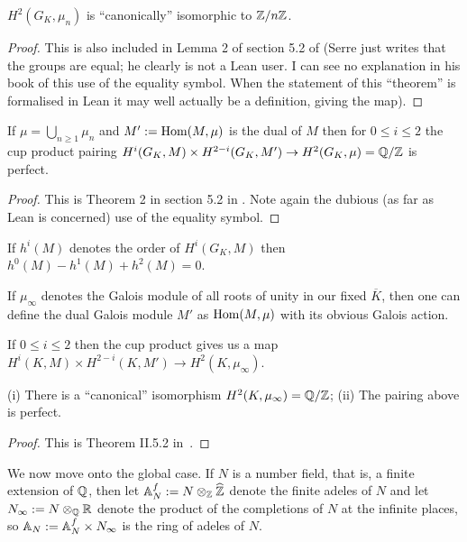 \begin{theorem} \label{local_galois_coh_top_degree}\notready $H^2(G_K,\mu_n)$ is ``canonically'' isomorphic to $\mathbb{Z}/n\mathbb{Z}$.
\end{theorem}
\begin{proof} This is also included in Lemma 2 of section 5.2 of \cite{serre-galcoh} (Serre just writes that the groups are equal; he clearly is not a Lean user. I can see no explanation in his book of this use of the equality symbol. When the statement of this ``theorem'' is formalised in Lean it may well actually be a definition, giving the map).
\end{proof}

\begin{theorem} \label{local_galois_coh_poincare}\notready If $\mu=\bigcup_{n\geq1}\mu_n$ and $M':=\operatorname{Hom}(M,\mu)$ is the dual of $M$ then for $0\leq i\leq 2$ the cup product pairing $H^i(G_K,M)\times H^{2-i}(G_K,M')\to H^2(G_K,\mu)=\mathbb{Q}/\mathbb{Z}$ is perfect.
\end{theorem}
\begin{proof}\notready This is Theorem 2 in section 5.2 in \cite{serre-galcoh}. Note again the dubious (as far as Lean is concerned) use of the equality symbol.
\end{proof}

\begin{theorem} \label{local_galois_coh_euler_poincare}\notready If $h^i(M)$ denotes the order of $H^i(G_K,M)$ then $h^0(M)-h^1(M)+h^2(M)=0$.
\end{theorem}

    If $\mu_\infty$ denotes the Galois module of all roots of unity in our fixed $\overline{K}$, then one can define the dual Galois module $M'$ as $\operatorname{Hom}(M,\mu)$ with its obvious Galois action.

If $0\leq i\leq 2$ then the cup product gives us a map $H^i(K,M)\times H^{2-i}(K,M')\to H^2(K,\mu_\infty)$.

\begin{theorem}\label{local_galois_coh_tate_duality}\notready
    (i) There is a ``canonical'' isomorphism $H^2(K,\mu_\infty)=\mathbb{Q}/\mathbb{Z}$;
    (ii) The pairing above is perfect.
\end{theorem}
\begin{proof}\notready
This is Theorem II.5.2 in~\cite{serre-galcoh}.
\end{proof}

We now move onto the global case. If $N$ is a number field, that is, a finite extension of $\mathbb{Q}$,
then let $\mathbb{A}_N^f:= N\otimes_{\mathbb{Z}}\widehat{\mathbb{Z}}$
denote the finite adeles of $N$ and let $N_\infty := N\otimes_{\mathbb{Q}}\mathbb{R}$ denote the product of the completions of $N$ at the infinite places, so $\mathbb{A}_N:=\mathbb{A}_N^f\times N_\infty$ is the ring of adeles of $N$.

